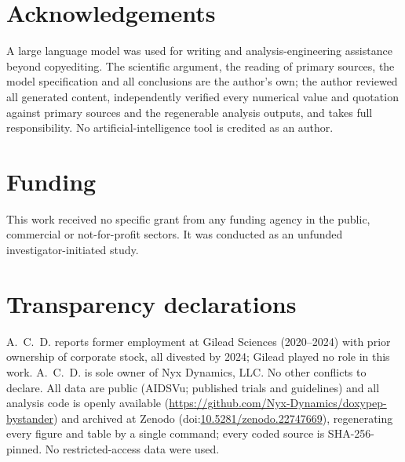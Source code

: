 \documentclass[12pt,a4paper]{article}
\begin{document}
\section*{Acknowledgements}
A large language model was used for writing and analysis-engineering assistance
beyond copyediting. The scientific argument, the reading of primary sources, the
model specification and all conclusions are the author's own; the author reviewed
all generated content, independently verified every numerical value and quotation
against primary sources and the regenerable analysis outputs, and takes full
responsibility. No artificial-intelligence tool is credited as an author.

\section*{Funding}
This work received no specific grant from any funding agency in the public,
commercial or not-for-profit sectors. It was conducted as an unfunded
investigator-initiated study.

\section*{Transparency declarations}
A.~C.~D. reports former employment at Gilead Sciences (2020--2024) with prior
ownership of corporate stock, all divested by 2024; Gilead played no role in this
work. A.~C.~D. is sole owner of Nyx Dynamics, LLC. No other conflicts to declare.
All data are public (AIDSVu; published trials and guidelines) and all analysis
code is openly available (\url{https://github.com/Nyx-Dynamics/doxypep-bystander})
and archived at Zenodo (doi:\url{10.5281/zenodo.22747669}),\cite{demidont2026compendium}
regenerating every figure
and table by a single command; every coded source is SHA-256-pinned. No
restricted-access data were used.


\end{document}
